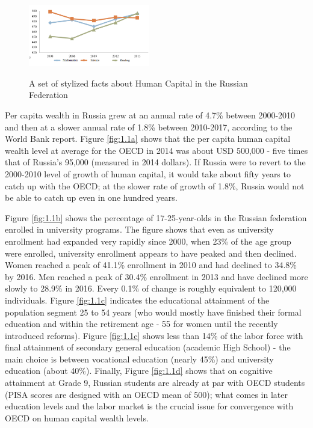 \documentclass[12pt,a4paper]{article}
\numberwithin{equation}{section}
\begin{document}
\begin{center}
\begin{figure}[H]
\begin{minipage}[b]{.5\linewidth}
		\end{minipage}
		\hfill
		\begin{minipage}[b]{.5\linewidth}
			\centering
			\hspace*{-0.7in}
			\includegraphics[width=150pt]{graph_1d.png}
			\label{fig:1.1d}
		\end{minipage}
		\hfill
		\caption{A set of stylized facts about Human Capital in the Russian Federation}\label{fig:1.1}
	\end{figure}
\end{center}

\vspace{-2em}

Per capita wealth in Russia grew at an annual rate of 4.7\% between 2000-2010 and then at a slower annual rate of 1.8\% between 2010-2017, according to the World Bank report. Figure \ref{fig:1.1a}  shows that the per capita human capital wealth level at average for the OECD in 2014 was about USD 500,000 - five times that of Russia's 95,000 (measured in 2014 dollars). If Russia were to revert to the 2000-2010 level of growth of human capital, it would take about fifty years to catch up with the OECD; at the slower rate of growth of 1.8\%, Russia would not be able to catch up even in one hundred years. 

Figure \ref{fig:1.1b}  shows the percentage of 17-25-year-olds in the Russian federation enrolled in university programs. The figure shows that even as university enrollment had expanded very rapidly since 2000, when 23\% of the age group were enrolled, university enrollment appears to have peaked and then declined. Women reached a peak of 41.1\% enrollment in 2010 and had declined to 34.8\% by 2016. Men reached a peak of 30.4\% enrollment in 2013 and have declined more slowly to 28.9\% in 2016. Every 0.1\% of change is roughly equivalent to 120,000 individuals. Figure \ref{fig:1.1c} indicates the educational attainment of the population segment 25 to 54 years (who would mostly have finished their formal education and within the retirement age - 55 for women until the recently introduced reforms). Figure \ref{fig:1.1c}  shows less than 14\% of the labor force with final attainment of secondary general education (academic High School) - the main choice is between vocational education (nearly 45\%) and university education (about 40\%). Finally, Figure \ref{fig:1.1d}  shows that on cognitive attainment at Grade 9, Russian students are already at par with OECD students (PISA scores are designed with an OECD mean of 500); what comes in later education levels and the labor market is the crucial issue for convergence with OECD on human capital wealth levels. 
\end{document}
